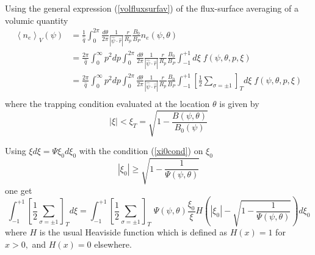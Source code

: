 Using the general expression (\ref{volfluxsurfav}) of the flux-surface
averaging of a volumic quantity
\begin{align}
\left\langle n_{e}\right\rangle _{V}\left( \psi\right) & =\frac{1}{\widehat{q%
}}\int_{0}^{2\pi}\frac{d\theta}{2\pi}\frac{1}{\left| \widehat {\psi}\cdot%
\widehat{r}\right| }\frac{r}{R_{p}}\frac{B_{0}}{B_{P}}n_{e}\left(
\psi,\theta\right)  \nonumber \\
& =\frac{2\pi}{\widehat{q}}\int_{0}^{\infty}p^{2}dp\int_{0}^{2\pi}\frac{
d\theta}{2\pi}\frac{1}{\left| \widehat{\psi}\cdot\widehat{r}\right| }\frac{r%
}{R_{p}}\frac{B_{0}}{B_{P}}\int_{-1}^{+1}d\xi\;f\left( \psi
,\theta,p,\xi\right)  \nonumber \\
& =\frac{2\pi}{\widehat{q}}\int_{0}^{\infty}p^{2}dp\int_{0}^{2\pi}\frac{
d\theta}{2\pi}\frac{1}{\left| \widehat{\psi}\cdot\widehat{r}\right| }\frac{r%
}{R_{p}}\frac{B_{0}}{B_{P}}\int_{-1}^{+1}\left[ \frac{1}{2}%
\sum_{\sigma=\pm1}\right] _{T}d\xi\;f\left( \psi,\theta,p,\xi\right)
\nonumber \\
\end{align}
where the trapping condition evaluated at the location $\theta$ is given by
\begin{equation}
\left| \xi\right| <\xi_{T}=\sqrt{1-\frac{B\left( \psi,\theta\right) }{
B_{0}\left( \psi\right) }}
\end{equation}

Using $\xi d\xi=\Psi\xi_{0}d\xi_{0}$ with the condition (\ref{xi0cond}) on $%
\xi_{0}$%
\begin{equation}
\left| \xi_{0}\right| \geq\sqrt{1-\frac{1}{\Psi\left( \psi,\theta\right) }}
\label{xi0cond2}
\end{equation}
one get
\begin{equation}
\int_{-1}^{+1}\left[ \frac{1}{2}\sum_{\sigma=\pm1}\right] _{T}d\xi=\int
_{-1}^{+1}\left[ \frac{1}{2}\sum_{\sigma=\pm1}\right] _{T}\;\Psi\left(
\psi,\theta\right) \frac{\xi_{0}}{\xi}H\left( \left| \xi_{0}\right| -\sqrt{1-%
\frac{1}{\Psi\left( \psi,\theta\right) }}\right) d\xi_{0}
\end{equation}
where $H$ is the usual Heaviside function which is defined as $H\left(
x\right) =1$ for $x>0,$ and $H\left( x\right) =0$ elsewhere.

